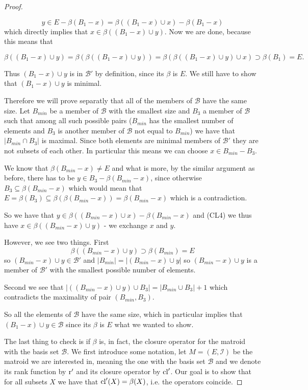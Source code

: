 \begin{proof}
\begin{enumerate}
    $$y \in E - \beta(B_1 - x) = \beta((B_1 -x )\cup x)-\beta(B_1 - x)$$ which directly implies that $x \in \beta((B_1 - x)\cup y)$. Now we are done, because this means that 
    
    $$\beta((B_1-x)\cup y) = \beta(\beta((B_1-x )\cup y)) = \beta(\beta((B_1 - x)\cup y)\cup x) \supset \beta(B_1) = E.$$
    
    
    Thus $(B_1 - x) \cup y$ is in $\mathcal{B}'$ by definition, since its $\beta$ is $E$. We still have to show that $(B_1 - x)\cup y$ is minimal.
    
    Therefore we will prove separatly that all of the members of $\mathcal{B}$ have the same size. Let $B_{min}$ be a member of $\mathcal{B}$ with the smallest size and $B_3$ a member of $\mathcal{B}$ such that among all such possible pairs ($B_{min}$ has the smallest number of elements and $B_3$ is another member of $\mathcal{B}$ not equal to $B_{min}$) we have that $|B_{min} \cap B_3|$ is maximal. Since both elements are minimal members of $\mathcal{B}'$ they are not subsets of each other. In particular this means we can choose $x \in B_{min} - B_3$. 
    
    We know that $\beta(B_{min}-x) \neq E$ and what is more, by the similar argument as before, there has to be $y \in B_3 - \beta(B_{min} - x)$, since otherwise $B_3 \subseteq \beta(B_{min} - x)$ which would mean that $E = \beta(B_3)\subseteq \beta(\beta(B_{min}-x)) = \beta(B_{min} - x)$ which is a contradiction. 
    
    So we have that $y \in \beta((B_{min}-x)\cup x) - \beta(B_{min} -x)$ and (CL4) we thus have $x \in \beta((B_{min}-x)\cup y)$ - we exchange $x$ and $y$. 
    
    However, we see two things. First
    $$\beta((B_{min} - x) \cup y) \supset \beta(B_{min}) = E$$ so $(B_{min} - x) \cup y \in \mathcal{B}'$ and $|B_{min}|  = |(B_{min} - x)\cup y|$ so $(B_{min} - x)\cup y$ is a member of $\mathcal{B}'$ with the smallest possible number of elements. 
    
    Second we see that $|((B_{min}-x)\cup y) \cup B_3| = |B_{min}\cup B_3|+1$ which contradicts the maximality of pair $(B_{min} ,B_3)$. 
    
    So all the elements of $\mathcal{B}$ have the same size, which in  particular implies that $(B_1 - x) \cup y \in \mathcal{B}$ since its $\beta$  is $E$ what we wanted to show.
    

\end{enumerate}


The last thing to check is if $\beta$ is, in fact, the closure operator for the matroid with the basis set $\mathcal{B}.$ We first introduce some notation, let $M = (E, \mathcal{I})$ be the matroid we are interested in, meaning the one with the basis set $\mathcal{B}$ and we denote its rank function by $\operatorname{r}'$ and its closure operator by $\mathrm{cl}'$. Our goal is to show that for all subsets $X$ we have that $\mathrm{cl}'(X) = \beta(X)$, i.e. the operators coincide.


\end{proof}
